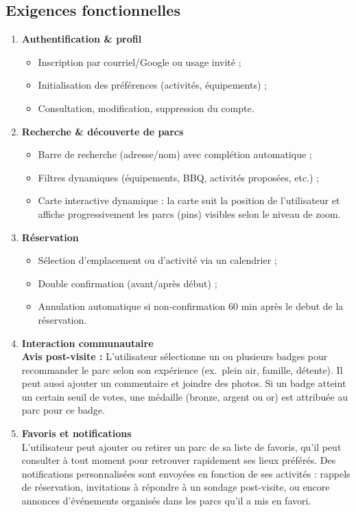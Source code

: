 \documentclass[12pt,a4paper]{article}
\begin{document}
\subsection{Exigences fonctionnelles}
\begin{enumerate}[label=\textbf{F\arabic*}.]
  \item \textbf{Authentification \& profil}  
        \begin{itemize}
          \item Inscription par courriel/Google ou usage invité ;
          \item Initialisation des préférences (activités, équipements) ;
          \item Consultation, modification, suppression du compte.
        \end{itemize}
  \item \textbf{Recherche \& découverte de parcs}  
        \begin{itemize}
          \item Barre de recherche (adresse/nom) avec  complétion automatique ;
          \item Filtres dynamiques (équipements, BBQ, activités proposées, etc.) ;
          \item Carte interactive dynamique : la carte suit la position de l'utilisateur et affiche progressivement les parcs (pins) visibles selon le niveau de zoom.

        \end{itemize}
  \item \textbf{Réservation}  
        \begin{itemize}
          \item Sélection d'emplacement ou d'activité via un calendrier ;
          \item Double confirmation (avant/après début) ;
          \item Annulation automatique si non-confirmation 60 min après le debut de la réservation.
        \end{itemize}
\item \textbf{Interaction communautaire} \\
\hspace*{1.5em}\textbf{Avis post-visite :} L'utilisateur sélectionne un ou plusieurs badges pour recommander le parc selon son expérience (ex.~plein air, famille, détente). Il peut aussi ajouter un commentaire et joindre des photos. Si un badge atteint un certain seuil de votes, une médaille (bronze, argent ou or) est attribuée au parc pour ce badge.

\item \textbf{Favoris et  notifications} \\
L'utilisateur peut ajouter ou retirer un parc de sa liste de favoris, qu'il peut consulter à tout moment pour retrouver rapidement ses lieux préférés. Des notifications personnalisées sont envoyées en fonction de ses activités : rappels de réservation, invitations à répondre à un sondage post-visite, ou encore annonces d'événements organisés dans les parcs qu'il a mis en favori.

\end{enumerate}
\end{document}

